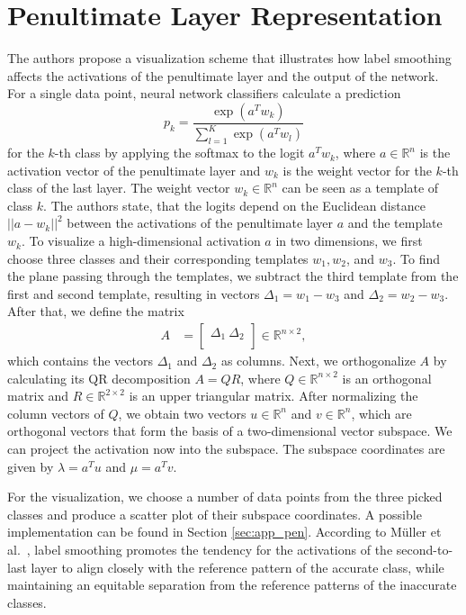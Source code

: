 \section{Penultimate Layer Representation}\label{sec:plr}
The authors propose a visualization scheme that illustrates how label smoothing affects the activations of the penultimate layer and the output of the network.
For a single data point, neural network classifiers calculate a prediction \begin{equation}
    p_k = \frac{\exp{(a^T w_k)}}{\sum_{l=1}^K \exp{(a^T w_l)}}\label{eq:softmax}
\end{equation} for the $k$-th class by applying the softmax to the logit $a^Tw_k$, where $a\in \mathbb{R}^{n}$ is the activation vector of the penultimate layer and $w_k$ is the weight vector for the $k$-th class of the last layer. The weight vector $w_k\in \mathbb{R}^{n}$ can be seen as a template of class $k$.
The authors state, that the logits depend on the Euclidean distance $||a-w_k||^2$ between the activations of the penultimate layer $a$ and the template $w_k$. 
To visualize a high-dimensional activation $a$ in two dimensions, we first choose three classes and their corresponding templates $w_1, w_2$, and $w_3$. To find the plane passing through the templates, we subtract the third template from the first and second template, resulting in vectors $\Delta_1 = w_1 - w_3$ and $\Delta_2 = w_2 - w_3$. 
After that, we define the matrix 
\begin{align*}
A &= \begin{bmatrix}
           \Delta_1~\Delta_2 \\
     \end{bmatrix}\in \mathbb{R}^{n\times 2},
\end{align*}
which contains the vectors  $\Delta_1$ and $\Delta_2$ as columns. Next, we  orthogonalize $A$ by calculating its QR decomposition $A= QR$, where $Q\in\mathbb{R}^{n\times 2}$ is an orthogonal matrix  and  $R \in \mathbb{R}^{2 \times 2}$ is an upper triangular matrix. After normalizing the column vectors of $Q$, we obtain two vectors $u \in \mathbb{R}^n$ and $v \in \mathbb{R}^n$, which are orthogonal vectors that form the basis of a two-dimensional vector subspace. We can project the activation now into the subspace. The subspace coordinates are given by $\lambda=a^Tu$ and $\mu=a^Tv$.

For the visualization, we choose a number of data points from the three picked classes and produce a scatter plot of their subspace coordinates. A possible implementation can be found in Section \ref{sec:app_pen}.
According to Müller et al.~\cite{mueller2019}, label smoothing promotes the tendency for the activations of the second-to-last layer to align closely with the reference pattern of the accurate class, while maintaining an equitable separation from the reference patterns of the inaccurate classes.

